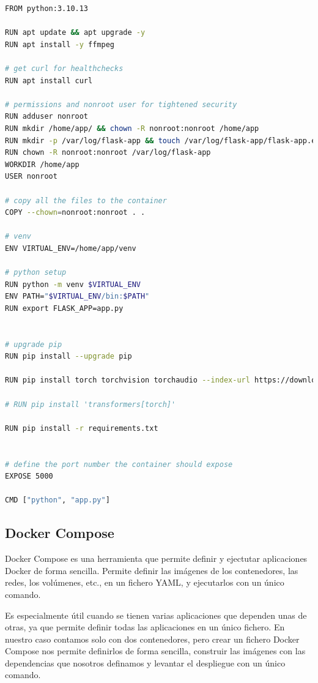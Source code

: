 \begin{lstlisting}[language=bash, caption={Dockerfile para la aplicación \textit{Flask}}, label={lst:dockerfile}]
FROM python:3.10.13

RUN apt update && apt upgrade -y
RUN apt install -y ffmpeg

# get curl for healthchecks
RUN apt install curl

# permissions and nonroot user for tightened security
RUN adduser nonroot
RUN mkdir /home/app/ && chown -R nonroot:nonroot /home/app
RUN mkdir -p /var/log/flask-app && touch /var/log/flask-app/flask-app.err.log && touch /var/log/flask-app/flask-app.out.log
RUN chown -R nonroot:nonroot /var/log/flask-app
WORKDIR /home/app
USER nonroot

# copy all the files to the container
COPY --chown=nonroot:nonroot . .

# venv
ENV VIRTUAL_ENV=/home/app/venv

# python setup
RUN python -m venv $VIRTUAL_ENV
ENV PATH="$VIRTUAL_ENV/bin:$PATH"
RUN export FLASK_APP=app.py


# upgrade pip
RUN pip install --upgrade pip

RUN pip install torch torchvision torchaudio --index-url https://download.pytorch.org/whl/cpu

# RUN pip install 'transformers[torch]'

RUN pip install -r requirements.txt


# define the port number the container should expose
EXPOSE 5000

CMD ["python", "app.py"]

\end{lstlisting}

\subsection{Docker Compose}
Docker Compose es una herramienta que permite definir y ejectutar aplicaciones Docker de forma sencilla.
Permite definir las imágenes de los contenedores, las redes, los volúmenes, etc., en un fichero YAML, y ejecutarlos con un único comando.

Es especialmente útil cuando se tienen varias aplicaciones que dependen unas de otras, ya que permite definir todas las aplicaciones en un único fichero.
En nuestro caso contamos solo con dos contenedores, pero crear un fichero Docker Compose nos permite definirlos de forma sencilla, construir las imágenes con las dependencias que nosotros definamos y levantar el despliegue con un único comando.

